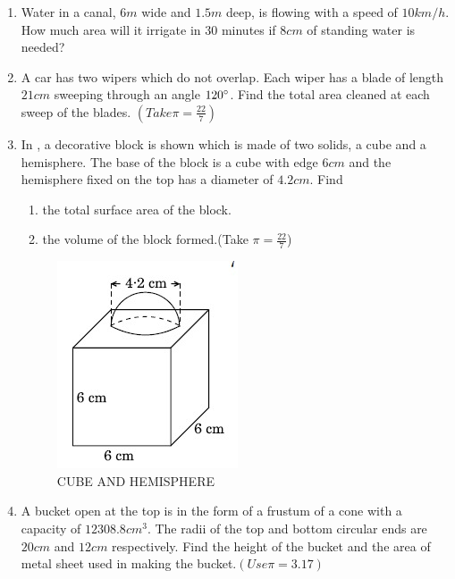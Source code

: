 \begin{enumerate}
\item Water in a canal, $6 m$ wide and $1.5 m$ deep, is flowing with a speed of $10 km/h $. How much area will it irrigate in $30$ minutes if $8 cm$ of standing water is needed?

\item A car has two wipers which do not overlap. Each wiper has a blade of length $21 cm$ sweeping through an angle $120\degree$. Find the total area cleaned at each sweep of the blades. $(Take  \pi=\frac{22}{7})$

\item In , a decorative block is shown which is made of two solids, a cube and a hemisphere. The base of the block is a cube with edge $6 cm $ and the hemisphere fixed on the top has a diameter of $4.2 cm $. Find
 \begin{enumerate}
 \item  the total surface area of the block.
 \item the volume of the block formed.(Take  $\pi=\frac{22}{7}$)
 \end{enumerate}
\begin{figure}[H]
    \centering
    \includegraphics[width=\columnwidth]{figs/image.png}
    \caption{CUBE AND HEMISPHERE}
    \label{fig:Fig-3}
\end{figure}

\item A bucket open at the top is in the form of a frustum of a cone with a capacity of $12308.8 cm^3 $. The radii of the top and bottom circular ends are $20 cm $ and $12 cm $ respectively. Find the height of the bucket and the area of metal sheet used in making the bucket.$(Use \pi=3.17)$

\end{enumerate}
